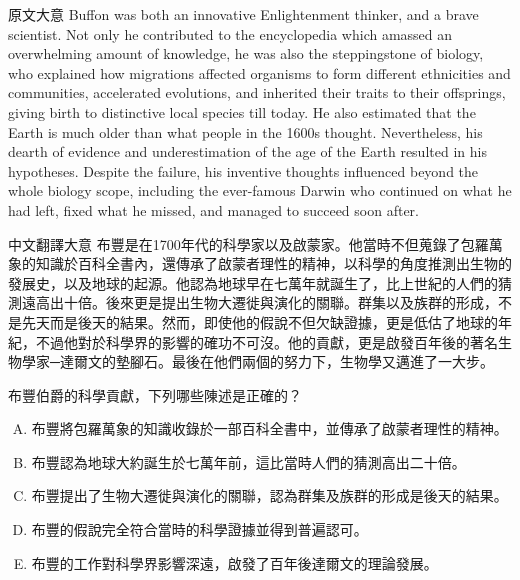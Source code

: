 \documentclass[
	a4paper,
	fontsize=11pt,
	twoside=true,
	numbers=noenddot,
]{article}
\begin{document}
\begin{large}
\begin{boxpar}{原文大意}
Buffon was both an innovative Enlightenment thinker, and a brave
scientist. Not only he contributed to the encyclopedia which amassed an
overwhelming amount of knowledge, he was also the steppingstone of
biology, who explained how migrations affected organisms to form
different ethnicities and communities, accelerated evolutions, and
inherited their traits to their offsprings, giving birth to distinctive
local species till today. He also estimated that the Earth is much older
than what people in the 1600s thought. Nevertheless, his dearth of
evidence and underestimation of the age of the Earth resulted in his
hypotheses. Despite the failure, his inventive thoughts influenced
beyond the whole biology scope, including the ever-famous Darwin who
continued on what he had left, fixed what he missed, and managed to
succeed soon after.
\end{boxpar}
\begin{boxpar}{中文翻譯大意}
布豐是在1700年代的科學家以及啟蒙家。他當時不但蒐錄了包羅萬象的知識於百科全書內，還傳承了啟蒙者理性的精神，以科學的角度推測出生物的發展史，以及地球的起源。他認為地球早在七萬年就誕生了，比上世紀的人們的猜測遠高出十倍。後來更是提出生物大遷徙與演化的關聯。群集以及族群的形成，不是先天而是後天的結果。然而，即使他的假說不但欠缺證據，更是低估了地球的年紀，不過他對於科學界的影響的確功不可沒。他的貢獻，更是啟發百年後的著名生物學家─達爾文的墊腳石。最後在他們兩個的努力下，生物學又邁進了一大步。
\end{boxpar}
\begin{tcolorbox}[title=多選題,colback=green!5!white,colframe=green!75!black]

布豐伯爵的科學貢獻，下列哪些陳述是正確的？\\

\begin{enumerate}[(A)]
    \item 布豐將包羅萬象的知識收錄於一部百科全書中，並傳承了啟蒙者理性的精神。
    \item 布豐認為地球大約誕生於七萬年前，這比當時人們的猜測高出二十倍。
    \item 布豐提出了生物大遷徙與演化的關聯，認為群集及族群的形成是後天的結果。
    \item 布豐的假說完全符合當時的科學證據並得到普遍認可。
    \item 布豐的工作對科學界影響深遠，啟發了百年後達爾文的理論發展。
\end{enumerate}


\end{tcolorbox}
\end{large}
\end{document}
